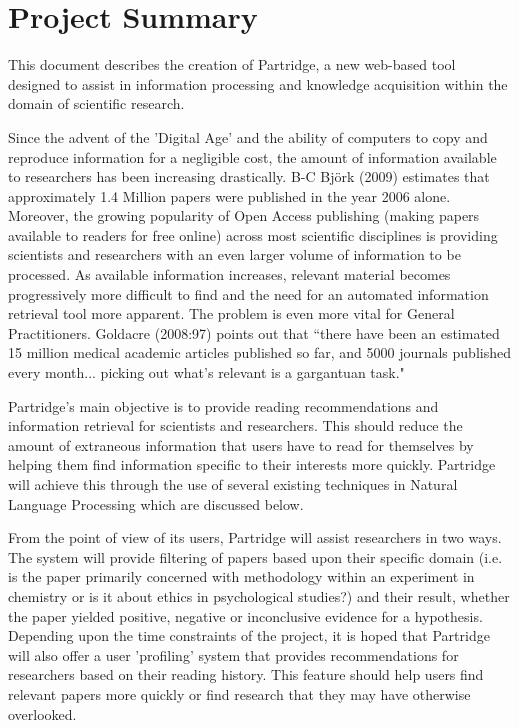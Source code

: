 \documentclass[12pt,a4paper]{article}
\begin{document}




\setlength{\parindent}{0pt}
\setlength{\parskip}{1.5ex plus 0.5ex minus 0.2ex}

\tableofcontents

\pagebreak

\section{Project Summary}

This document describes the creation of Partridge, a new web-based tool
designed to assist in information processing and knowledge acquisition within
the domain of scientific research.

Since the advent of the 'Digital Age' and the ability of computers to copy and
reproduce information for a negligible cost, the amount of information
available to researchers has been increasing drastically.  B-C Bj\"{o}rk (2009)
estimates that approximately 1.4 Million papers were published in the year 2006
alone\cite{bjork2009}. Moreover, the growing popularity of Open Access
publishing (making papers available to readers for free online\cite{Suber2012}) across
most scientific disciplines\cite{bjork2009}\cite{harnad2004comparing} is
providing scientists and researchers with an even larger volume of information to be
processed. As available information increases, relevant material becomes
progressively more difficult to find and the need for an automated information
retrieval tool more apparent. The problem is even more vital for General
Practitioners. Goldacre (2008:97) points out that ``there have been an
estimated 15 million medical academic articles published so far, and 5000
journals published every month... picking out what's relevant is a gargantuan
task."\cite{goldacre2008bad} 

Partridge's main objective is to provide reading recommendations and
information retrieval for scientists and researchers. This should reduce the
amount of extraneous information that users have to read for themselves by
helping them find information specific to their interests more quickly.
Partridge will achieve this through the use of several existing techniques in
Natural Language Processing which are discussed below.

From the point of view of its users, Partridge will assist researchers in two
ways. The system will provide filtering of papers based upon their
specific domain (i.e. is the paper primarily concerned with methodology within
an experiment in chemistry or is it about ethics in psychological studies?) and
their result, whether the paper yielded positive, negative or inconclusive
evidence for a hypothesis. Depending upon the time constraints of the
project, it is hoped that Partridge will also offer a user 'profiling' system
that provides recommendations for researchers based on their reading history.
This feature should help users find relevant papers more quickly or find
research that they may have otherwise overlooked.
\end{document}
